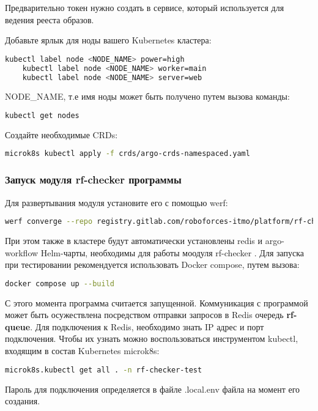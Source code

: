 Предварительно токен нужно создать в сервисе, который используется для ведения рееста образов.


Добавьте ярлык для ноды вашего Kubernetes кластера:
\begin{lstlisting}[language=bash, numbers=none, frame=single]
    kubectl label node <NODE_NAME> power=high
    kubectl label node <NODE_NAME> worker=main
    kubectl label node <NODE_NAME> server=web
\end{lstlisting}

NODE\_NAME, т.е имя ноды может быть получено путем вызова команды:
\begin{lstlisting}[language=bash, numbers=none, frame=single]
    kubectl get nodes
\end{lstlisting}

Создайте необходимые CRDs:
\begin{lstlisting}[language=bash, numbers=none, frame=single]
    microk8s kubectl apply -f crds/argo-crds-namespaced.yaml
\end{lstlisting}




\subsubsection{Запуск модуля rf-checker программы \productname}
Для развертывания модуля установите его с помощью werf:
\begin{lstlisting}[language=bash, numbers=none, frame=single]
    werf converge --repo registry.gitlab.com/roboforces-itmo/platform/rf-checker --set replicaCount=0 --set tenant.enabled=true --dev --env test
\end{lstlisting}
При этом также в кластере будут автоматически установлены redis и argo-workflow Helm-чарты, необходимы для работы моодуля rf-checker \productname. 
Для запуска при тестировании рекомендуется использовать Docker compose, путем вызова:
\begin{lstlisting}[language=bash, numbers=none, frame=single]
    docker compose up --build
\end{lstlisting}

С этого момента программа считается запущенной. Коммуникация с программой может быть осужествлена посредством отправки запросов в Redis очередь \textbf{rf-queue}. Для подключения к Redis, необходимо знать IP адрес и порт подключения. Чтобы их узнать можно воспользоваться инструментом kubectl, входящим в состав Kubernetes microk8s:
\begin{lstlisting}[language=bash, numbers=none, frame=single]
    microk8s.kubectl get all . -n rf-checker-test
\end{lstlisting}
Пароль для подключения определяется в файле .local.env файла на момент его создания.

